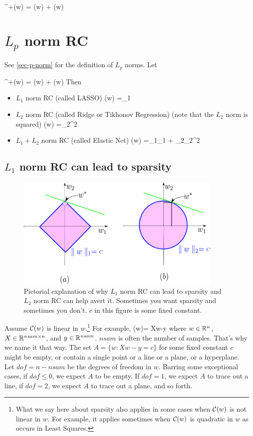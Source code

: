 \beq
\calc^+(w) = \calc(w) + \calr(w)
\eeq



\section{$L_p$ norm RC}

See \ref{sec-p-norm}
for the definition of
$L_p$ norms.  Let

\beq
\calc^+(w) = \calc(w) + \calr(w)
\eeq
Then


\begin{itemize}
\item $L_1$ norm RC (called LASSO)
\beq
\calr(w) =\lam{}_1
\eeq

\item $L_2$ norm RC (called Ridge or Tikhonov Regression) (note that the $L_2$ norm is squared)
\beq
\calr(w) =\lam{}_2^2
\eeq

\item
$L_1 + L_2$ norm RC (called Elastic Net)
\beq
\calr(w) =\lam_1_1
+ \lam_2_2^2
\eeq
\end{itemize}

\subsection{$L_1$ norm RC can lead to sparsity}

\begin{figure}[h!]
\centering
\includegraphics[width=4in]
{regularization/sparsity.png}
\caption{Pictorial explanation of
why $L_1$ norm RC can lead to sparsity
and $L_2$ norm RC can help avert it. Sometimes 
you want sparsity and sometimes you don't. $c$ in this figure is some 
fixed constant.
}
\label{fig-sparsity}
\end{figure}

Assume ${\cal C}(w)$ is linear in $w$.\footnote{What we say here about sparsity also applies in some cases when ${\cal C}(w)$ is not linear in $w$. For example, it applies sometimes when ${\cal C}(w)$
is quadratic in $w$ as occurs in Least Squares.}
For example, 
\beq
\calc(w)= Xw-y
\eeq
where $w\in{ \mathbb{R}}^n$, $X\in { \mathbb{R}}^{nsam\times n}$,  and $y\in{ \mathbb{R}}^{nsam}$.
$nsam$ is often the number of samples. That's why we name it that way.
The set $A=\{w: Xw-y=c\}$ for some fixed constant $c$  might be empty,
or contain a single point or a line or a plane, or a hyperplane. Let $dof=n-nsam$
be the degrees  of freedom in $w$.
Barring some exceptional cases, if $dof\leq 0$, we expect $A$ to be empty.
If $dof=1$, we expect $A$ to trace out a line, if $dof= 2$, we expect $A$ to
trace out a plane, and so forth.

